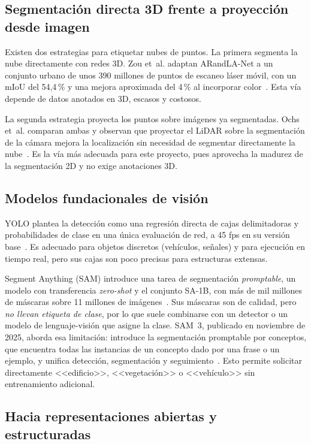 \documentclass[11pt, twoside]{article}
\begin{document}
\subsection{Segmentación directa 3D frente a proyección desde imagen}
 
Existen dos estrategias para etiquetar nubes de puntos. La primera segmenta la nube directamente con redes 3D. Zou et~al. adaptan ARandLA-Net a un conjunto urbano de unos 390 millones de puntos de escaneo láser móvil, con un mIoU del 54,4\,\% y una mejora aproximada del 4\,\% al incorporar color~\cite{zou2021towards}. Esta vía depende de datos anotados en 3D, escasos y costosos.
 
La segunda estrategia proyecta los puntos sobre imágenes ya segmentadas. Ochs et~al. comparan ambas y observan que proyectar el LiDAR sobre la segmentación de la cámara mejora la localización sin necesidad de segmentar directamente la nube~\cite{ochs2025boosting}. Es la vía más adecuada para este proyecto, pues aprovecha la madurez de la segmentación 2D y no exige anotaciones 3D.
 
\subsection{Modelos fundacionales de visión}
 
YOLO plantea la detección como una regresión directa de cajas delimitadoras y probabilidades de clase en una única evaluación de red, a 45 fps en su versión base~\cite{redmon2016yolo}. Es adecuado para objetos discretos (vehículos, señales) y para ejecución en tiempo real, pero sus cajas son poco precisas para estructuras extensas.
 
Segment Anything (SAM) introduce una tarea de segmentación \emph{promptable}, un modelo con transferencia \emph{zero-shot} y el conjunto SA-1B, con más de mil millones de máscaras sobre 11 millones de imágenes~\cite{kirillov2023sam}. Sus máscaras son de calidad, pero \emph{no llevan etiqueta de clase}, por lo que suele combinarse con un detector o un modelo de lenguaje-visión que asigne la clase. SAM~3, publicado en noviembre de 2025, aborda esa limitación: introduce la segmentación promptable por conceptos, que encuentra todas las instancias de un concepto dado por una frase o un ejemplo, y unifica detección, segmentación y seguimiento~\cite{carion2025sam3}. Esto permite solicitar directamente <<edificio>>, <<vegetación>> o <<vehículo>> sin entrenamiento adicional.
 
\subsection{Hacia representaciones abiertas y estructuradas}
 
\end{document}
